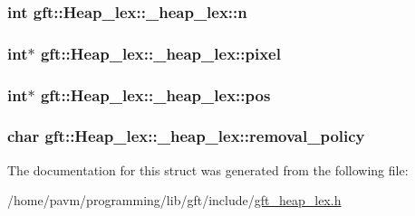 \hypertarget{structgft_1_1Heap__lex_1_1__heap__lex_a1401a3c1ed4b831f50b513034b7e881a}{
\subsubsection[{n}]{\setlength{\rightskip}{0pt plus 5cm}int gft\-::\-Heap\-\_\-lex\-::\-\_\-heap\-\_\-lex\-::n}}\label{structgft_1_1Heap__lex_1_1__heap__lex_a1401a3c1ed4b831f50b513034b7e881a}
\hypertarget{structgft_1_1Heap__lex_1_1__heap__lex_ad0959c04c1544378684b566f6d2cbe8c}{
\subsubsection[{pixel}]{\setlength{\rightskip}{0pt plus 5cm}int$\ast$ gft\-::\-Heap\-\_\-lex\-::\-\_\-heap\-\_\-lex\-::pixel}}\label{structgft_1_1Heap__lex_1_1__heap__lex_ad0959c04c1544378684b566f6d2cbe8c}
\hypertarget{structgft_1_1Heap__lex_1_1__heap__lex_a5930686532a650d25969bba672e88d35}{
\subsubsection[{pos}]{\setlength{\rightskip}{0pt plus 5cm}int$\ast$ gft\-::\-Heap\-\_\-lex\-::\-\_\-heap\-\_\-lex\-::pos}}\label{structgft_1_1Heap__lex_1_1__heap__lex_a5930686532a650d25969bba672e88d35}
\hypertarget{structgft_1_1Heap__lex_1_1__heap__lex_ae260010a97dcb6824b62a594d3477709}{
\subsubsection[{removal\-\_\-policy}]{\setlength{\rightskip}{0pt plus 5cm}char gft\-::\-Heap\-\_\-lex\-::\-\_\-heap\-\_\-lex\-::removal\-\_\-policy}}\label{structgft_1_1Heap__lex_1_1__heap__lex_ae260010a97dcb6824b62a594d3477709}


The documentation for this struct was generated from the following file\-:\begin{DoxyCompactItemize}
\item 
/home/pavm/programming/lib/gft/include/\hyperlink{gft__heap__lex_8h}{gft\-\_\-heap\-\_\-lex.\-h}\end{DoxyCompactItemize}
